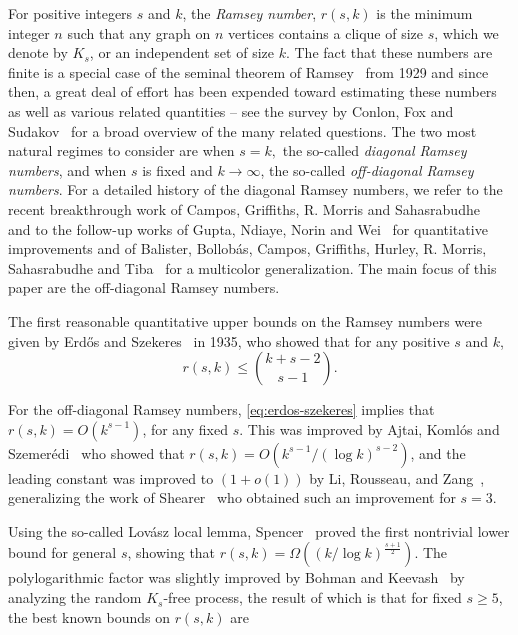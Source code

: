 \documentclass{article}
\theoremstyle{plain}
\theoremstyle{definition}
\begin{document}
For positive integers $s$ and $k$, the \emph{Ramsey number}, $r(s, k)$ is the minimum integer $n$ such that any graph on $n$ vertices contains a clique of size $s$, which we denote by $K_s$, or an independent set of size $k$. The fact that these numbers are finite is a special case of the seminal theorem of Ramsey~\cite{ramsey} from 1929 and since then, a great deal of effort has been expended toward estimating these numbers as well as various related quantities -- see the survey by Conlon, Fox and Sudakov~\cite{CFSsurvey} for a broad overview of the many related questions. The two most natural regimes to consider are when $s = k,$ the so-called \emph{diagonal Ramsey numbers}, and when $s$ is fixed and $k \rightarrow \infty$, the so-called \emph{off-diagonal Ramsey numbers}. For a detailed history of the diagonal Ramsey numbers, we refer to the recent breakthrough work of Campos, Griffiths, R. Morris and Sahasrabudhe~\cite{CGMS} and to the follow-up works of Gupta, Ndiaye, Norin and Wei~\cite{gupta} for quantitative improvements and of Balister, Bollob\'{a}s, Campos, Griffiths, Hurley, R. Morris, Sahasrabudhe and Tiba~\cite{balister} for a multicolor generalization. The main focus of this paper are the off-diagonal Ramsey numbers.

The first reasonable quantitative upper bounds on the Ramsey numbers were given by Erd\H{o}s and Szekeres~\cite{erdos-szekeres} in 1935, who showed that for any positive $s$ and $k$, 
\begin{equation} \label{eq:erdos-szekeres}
    r(s, k) \le \binom{k+s-2}{s-1}.
\end{equation}

For the off-diagonal Ramsey numbers, \eqref{eq:erdos-szekeres} implies that $r(s, k) = O(k^{s-1})$, for any fixed $s$. This was improved by Ajtai, Koml\'{o}s and Szemer\'{e}di~\cite{ajtai} who showed that $r(s, k) = O(k^{s-1} / (\log k)^{s-2})$, and the leading constant was improved to $(1+o(1))$ by Li, Rousseau, and Zang~\cite{li-rousseau-zang}, generalizing the work of Shearer~\cite{shearer} who obtained such an improvement for $s=3$.

Using the so-called Lov\'{a}sz local lemma, Spencer~\cite{spencer75, spencer77} proved the first nontrivial lower bound for general $s$, showing that $r(s, k) = \Omega\left((k / \log k)^{\frac{s+1}{2}}\right).$ The polylogarithmic factor was slightly improved by Bohman and Keevash~\cite{bohman-keevash-Ks} by analyzing the random $K_s$-free process, the result of which is that for fixed $s \ge 5$, the best known bounds on $r(s, k)$ are
\end{document}
